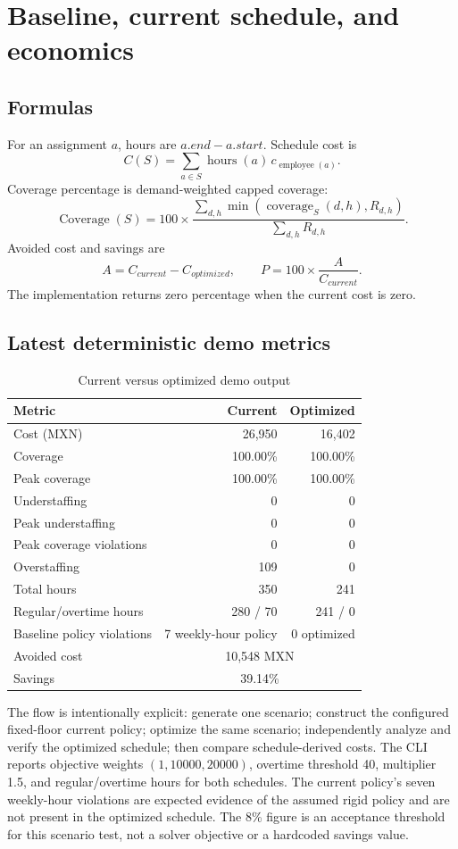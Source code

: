 \documentclass[11pt,a4paper]{article}
\begin{document}
\section{Baseline, current schedule, and economics}
\subsection{Formulas}
For an assignment $a$, hours are $a.end-a.start$. Schedule cost is
\[
C(S)=\sum_{a\in S}\operatorname{hours}(a)\,c_{\operatorname{employee}(a)}.
\]
Coverage percentage is demand-weighted capped coverage:
\[
\operatorname{Coverage}(S)=100\times
\frac{\sum_{d,h}\min(\operatorname{coverage}_S(d,h),R_{d,h})}
{\sum_{d,h}R_{d,h}}.
\]
Avoided cost and savings are
\[
A=C_{current}-C_{optimized},\qquad
P=100\times\frac{A}{C_{current}}.
\]
The implementation returns zero percentage when the current cost is zero.

\subsection{Latest deterministic demo metrics}
\begin{table}[ht]
\centering
\caption{Current versus optimized demo output}
\begin{tabular}{lrr}
\toprule
Metric & Current & Optimized\\
\midrule
Cost (MXN) & 26,950 & 16,402\\
Coverage & 100.00\% & 100.00\%\\
Peak coverage & 100.00\% & 100.00\%\\
Understaffing & 0 & 0\\
Peak understaffing & 0 & 0\\
Peak coverage violations & 0 & 0\\
Overstaffing & 109 & 0\\
Total hours & 350 & 241\\
Regular/overtime hours & 280 / 70 & 241 / 0\\
Baseline policy violations & 7 weekly-hour policy & 0 optimized\\
\midrule
Avoided cost & \multicolumn{2}{c}{10,548 MXN}\\
Savings & \multicolumn{2}{c}{39.14\%}\\
\bottomrule
\end{tabular}
\end{table}

The flow is intentionally explicit: generate one scenario; construct the configured fixed-floor current policy; optimize the same scenario; independently analyze and verify the optimized schedule; then compare schedule-derived costs. The CLI reports objective weights $(1,10000,20000)$, overtime threshold 40, multiplier 1.5, and regular/overtime hours for both schedules. The current policy's seven weekly-hour violations are expected evidence of the assumed rigid policy and are not present in the optimized schedule. The 8\% figure is an acceptance threshold for this scenario test, not a solver objective or a hardcoded savings value.
\end{document}
